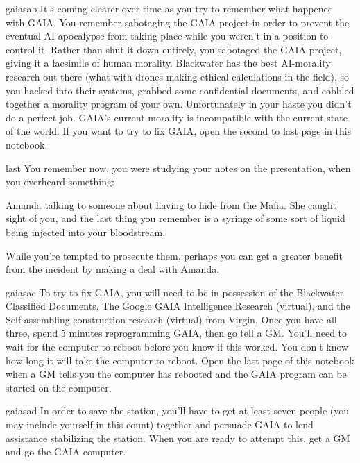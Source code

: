 \documentclass[greennotebook]{NeptuneBall}
\begin{document}
\begin{page}{gaiasab}
It's coming clearer over time as you try to remember what happened with GAIA. You remember sabotaging the GAIA project in order to prevent the eventual AI
apocalypse from taking place while you weren't in a position to control
it. Rather than shut it down entirely, you sabotaged the GAIA project, giving it a facsimile of human morality. Blackwater  has the best AI-morality research out there (what with drones making ethical calculations in the field), so you hacked into their systems, grabbed some confidential documents, and cobbled together a morality program of your own. Unfortunately in your haste you didn't do a perfect job. GAIA's current morality is incompatible with the current state of the world. If you want to try to fix GAIA, open the second to last page in this notebook.
\end{page}

\begin{page}{last}
You remember now, you were studying your notes on the presentation, when you
overheard something:

Amanda talking to someone about having to hide from the
Mafia. She caught sight of you, and the last thing you
remember is a syringe of some sort of liquid being injected into your
bloodstream.

While you're tempted to prosecute them, perhaps you can get a greater benefit
from the incident by making a deal with Amanda.
\end{page}

\begin{page}{gaiasac}
To try to fix GAIA, you will need to be in possession of the Blackwater Classified Documents, The Google GAIA Intelligence Research (virtual), and the Self-assembling construction research (virtual) from Virgin. Once you have all three, spend 5 minutes reprogramming GAIA, then go tell a GM. You'll need to wait for the computer to reboot before you know if this worked. You don't know how long it will take the computer to reboot. Open the last page of this notebook when a GM tells you the computer has rebooted and the GAIA program can be started on the computer. 
\end{page}

\begin{page}{gaiasad}
In order to save the station, you'll have to get at least seven people (you may include yourself in this count) together and persuade GAIA to lend assistance stabilizing the station. When you are ready to attempt this, get a GM and go the GAIA computer.
\end{page}

\endnotebook
\end{document}
